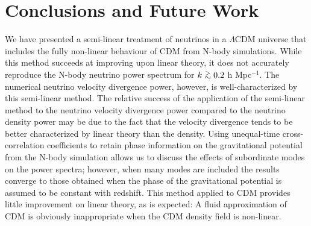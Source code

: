 \documentclass{aastex}
\def\gtsima{$\; \buildrel > \over \sim \;$}
\def\gsim{\lower.5ex\hbox{\gtsima}}
\begin{document}






\section{Conclusions and Future Work}
\label{sec:Conclusions}

We have presented a
semi-linear treatment of neutrinos in a $\Lambda$CDM
universe that includes the
fully non-linear behaviour of CDM from N-body
simulations.  While this method succeeds at
improving upon linear theory, it does not accurately
reproduce the N-body neutrino power spectrum for
$k\gsim0.2$ h Mpc$^{-1}$.  The
numerical neutrino velocity divergence power, however, is well-characterized by
this semi-linear method.  The relative success of the application of
the semi-linear method to the 
neutrino velocity divergence power compared to the
neutrino density power may be due to the fact that the velocity
divergence tends to be better characterized by linear theory than the density.
Using unequal-time cross-correlation
coefficients to retain phase information on the gravitational potential
from the N-body simulation allows us to discuss the effects of
 subordinate modes on the power spectra; however, when many modes are included
 the results converge to those
obtained when the phase of the gravitational potential is assumed to
be constant with redshift. 
This method applied to CDM 
provides little improvement on linear theory, as is expected: A fluid approximation of CDM is
obviously inappropriate when the CDM density field is non-linear.  
\end{document}
